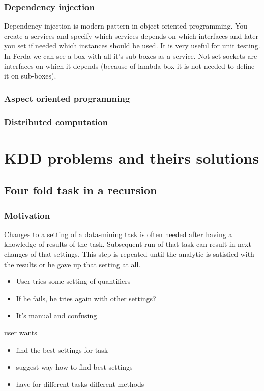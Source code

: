 \documentclass[a4paper,12pt]{book}
\begin{document}
\subsection{Dependency injection}
Dependency injection is modern pattern in object oriented programming. You create a services and specify which services depends on which interfaces and later you set if needed which instances should be used. It is very useful for unit testing. In Ferda we can see a box with all it's sub-boxes as a service. Not set sockets are interfaces on which it depends (because of lambda box it is not needed to define it on sub-boxes).

\subsection{Aspect oriented programming}
\subsection{Distributed computation}
\chapter{KDD problems and theirs solutions}
\section{Four fold task in a recursion}
\subsection{Motivation}
Changes to a setting of a data-mining task is often needed after having a knowledge of results of the task. Subsequent run of that task can result in next changes of that settings. This step is repeated until the analytic is satisfied with the results or he gave up that setting at all.

\begin{itemize}
			\item User tries some setting of quantifiers
			\item If he fails, he tries again with other settings?
			\item It's manual and confusing
\end{itemize}
		user wants
		\begin{itemize}
			\item find the best settings for task
			\item suggest way how to find best settings
			\item have for different tasks different methods
		\end{itemize}
\end{document}
